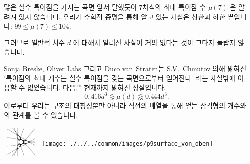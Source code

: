 \begin{surferPage}{많은 실수 특이점을 가지는 곡면}
    앞서 말했듯이 $7$차식의 최대 특이점 수 $\mu(7)$ 은 알려져 있지 않습니다. 우리가 수학적 증명을 통해 알고 있는 사실은 상한과 하한 뿐입니다:
$99\le \mu(7) \le 104$.


    그러므로 일반적 차수 $d$ 에 대해서 알려진 사실이 거의 없다는 것이 그다지 놀랍지 않습니다. 

    Sonja Breske, Oliver Labs 그리고 Duco van~Straten는 S.V.\ Chmutov 의해 밝혀진 '특이점의 최대 개수는 실수 특이점을 갖는 곡면으로부터 얻어진다' 라는 사실밖에 이용할 수 없었습니다. 다음은 현재까지 밝혀진 성질입니다.
    \[0,41\bar{6}d^3 \lessapprox \mu(d) \lessapprox 0.44\bar{4} d^3.\]
    이로부터 우리는 구조의 대칭성뿐만 아니라 직선의 배열을 통해 얻는 삼각형의 개수와의 관계를 볼 수 있습니다. 

    \begin{center}
      \begin{tabular}{c@{\qquad}c}
        \includegraphics[height=1.5cm]{./../../common/images/vielesing.pdf}
        &
        \texttt{[image: ./../../common/images/p9surface\_von\_oben]}
      \end{tabular}
    \end{center}
\end{surferPage}
